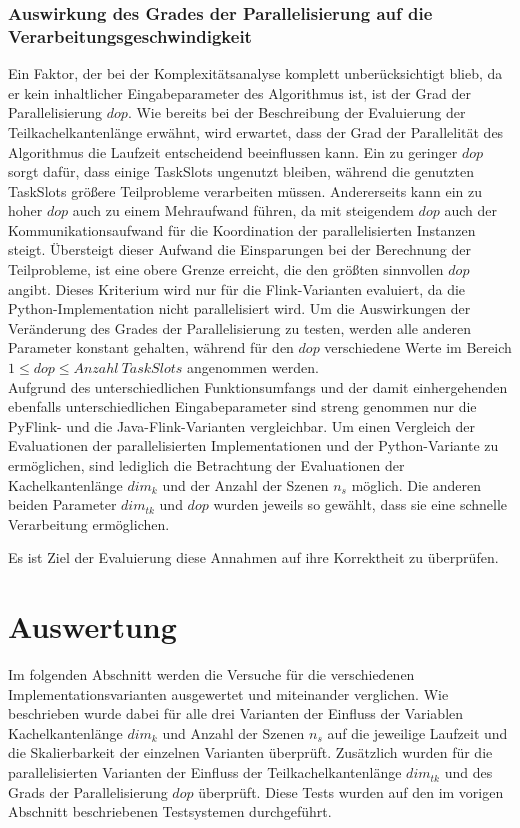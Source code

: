 \subsubsection{Auswirkung des Grades der Parallelisierung auf die Verarbeitungsgeschwindigkeit}
Ein Faktor, der bei der Komplexitätsanalyse komplett unberücksichtigt blieb, da er kein inhaltlicher Eingabeparameter des Algorithmus ist, ist der Grad der Parallelisierung $dop$. Wie bereits bei der Beschreibung der Evaluierung der Teilkachelkantenlänge erwähnt, wird erwartet, dass der Grad der Parallelität des Algorithmus die Laufzeit entscheidend beeinflussen kann. Ein zu geringer $dop$ sorgt dafür, dass einige TaskSlots ungenutzt bleiben, während die genutzten TaskSlots größere Teilprobleme verarbeiten müssen. Andererseits kann ein zu hoher $dop$ auch zu einem Mehraufwand führen, da mit steigendem $dop$ auch der Kommunikationsaufwand für die Koordination der parallelisierten Instanzen steigt. Übersteigt dieser Aufwand die Einsparungen bei der Berechnung der Teilprobleme, ist eine obere Grenze erreicht, die den größten sinnvollen $dop$ angibt. Dieses Kriterium wird nur für die Flink-Varianten evaluiert, da die Python-Implementation nicht parallelisiert wird. Um die Auswirkungen der Veränderung des Grades der Parallelisierung zu testen, werden alle anderen Parameter konstant gehalten, während für den $dop$ verschiedene Werte im Bereich $1 \leq dop \leq Anzahl\ TaskSlots$ angenommen werden. \\

Aufgrund des unterschiedlichen Funktionsumfangs und der damit einhergehenden ebenfalls unterschiedlichen Eingabeparameter sind streng genommen nur die PyFlink- und die Java-Flink-Varianten vergleichbar. Um einen Vergleich der Evaluationen der parallelisierten Implementationen und der Python-Variante zu ermöglichen, sind lediglich die Betrachtung der Evaluationen der Kachelkantenlänge $dim_k$ und der Anzahl der Szenen $n_s$ möglich. Die anderen beiden Parameter $dim_{tk}$ und $dop$ wurden jeweils so gewählt, dass sie eine schnelle Verarbeitung ermöglichen.

Es ist Ziel der Evaluierung diese Annahmen auf ihre Korrektheit zu überprüfen.


\section{Auswertung}
Im folgenden Abschnitt werden die Versuche für die verschiedenen Implementationsvarianten ausgewertet und miteinander verglichen. Wie beschrieben wurde dabei für alle drei Varianten der Einfluss der Variablen Kachelkantenlänge $dim_k$ und Anzahl der Szenen $n_s$ auf die jeweilige Laufzeit und die Skalierbarkeit der einzelnen Varianten überprüft. Zusätzlich wurden für die parallelisierten Varianten der Einfluss der Teilkachelkantenlänge $dim_{tk}$ und des Grads der Parallelisierung $dop$ überprüft. Diese Tests wurden auf den im vorigen Abschnitt beschriebenen Testsystemen durchgeführt. 

